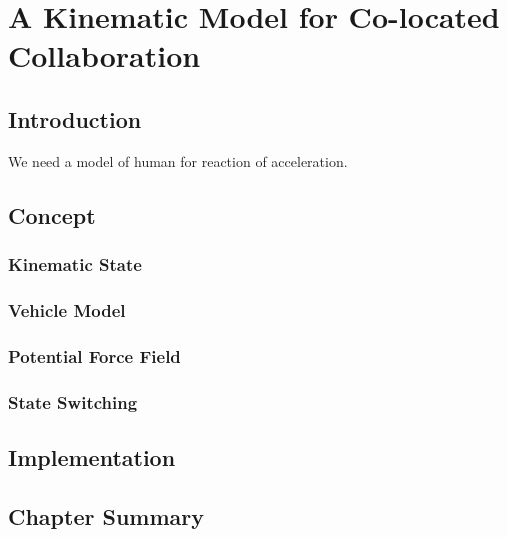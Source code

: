 \chapter{A Kinematic Model for Co-located Collaboration}
\label{chapter:kinematics}
\minitoc

\section{Introduction}
We need a model of human for reaction of acceleration.

\section{Concept}
\subsection{Kinematic State}
\subsection{Vehicle Model}
\subsection{Potential Force Field}
\subsection{State Switching}

\section{Implementation}

\section{Chapter Summary}
